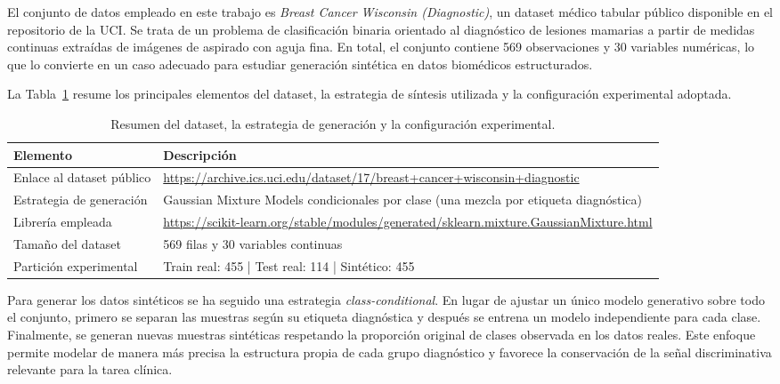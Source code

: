 \documentclass[11pt,a4paper]{article}
\begin{document}
El conjunto de datos empleado en este trabajo es \textit{Breast Cancer Wisconsin (Diagnostic)}, un dataset médico tabular público disponible en el repositorio de la UCI. Se trata de un problema de clasificación binaria orientado al diagnóstico de lesiones mamarias a partir de medidas continuas extraídas de imágenes de aspirado con aguja fina. En total, el conjunto contiene 569 observaciones y 30 variables numéricas, lo que lo convierte en un caso adecuado para estudiar generación sintética en datos biomédicos estructurados.

La Tabla~\ref{tab:resumen_inicial} resume los principales elementos del dataset, la estrategia de síntesis utilizada y la configuración experimental adoptada.

\begin{table}[H]
\centering
\renewcommand{\arraystretch}{1.2}
\begin{tabular}{>{\raggedright\arraybackslash}p{4.6cm} p{10cm}}
\toprule
\textbf{Elemento} & \textbf{Descripción} \\
\midrule
Enlace al dataset público & \url{https://archive.ics.uci.edu/dataset/17/breast+cancer+wisconsin+diagnostic} \\
Estrategia de generación & Gaussian Mixture Models condicionales por clase (una mezcla por etiqueta diagnóstica) \\
Librería empleada & \url{https://scikit-learn.org/stable/modules/generated/sklearn.mixture.GaussianMixture.html} \\
Tamaño del dataset & 569 filas y 30 variables continuas \\
Partición experimental & Train real: 455 \;|\; Test real: 114 \;|\; Sintético: 455 \\
\bottomrule
\end{tabular}
\caption{Resumen del dataset, la estrategia de generación y la configuración experimental.}
\label{tab:resumen_inicial}
\end{table}

Para generar los datos sintéticos se ha seguido una estrategia \textit{class-conditional}. En lugar de ajustar un único modelo generativo sobre todo el conjunto, primero se separan las muestras según su etiqueta diagnóstica y después se entrena un modelo independiente para cada clase. Finalmente, se generan nuevas muestras sintéticas respetando la proporción original de clases observada en los datos reales. Este enfoque permite modelar de manera más precisa la estructura propia de cada grupo diagnóstico y favorece la conservación de la señal discriminativa relevante para la tarea clínica.
\end{document}

